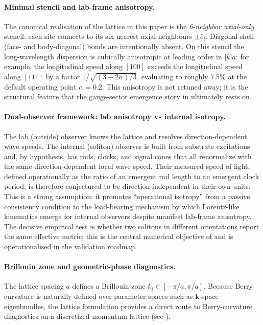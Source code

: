 \paragraph{Minimal stencil and lab-frame anisotropy.}
The canonical realisation of the lattice in this paper is the \emph{6-neighbor axial-only} stencil:
each site connects to its six nearest axial neighbours $\pm\hat{e}_i$.
Diagonal-shell (face- and body-diagonal) bonds are intentionally absent.
On this stencil the long-wavelength dispersion is cubically anisotropic at leading order in $|k|a$:
for example, the longitudinal speed along $[100]$ exceeds the longitudinal speed along $[111]$
by a factor $1/\sqrt{(3-2\alpha)/3}$, evaluating to roughly $7.5\%$ at the default operating point $\alpha=0.2$.
This anisotropy is not retuned away; it is the structural feature that the gauge-sector emergence story in
 ultimately rests on.

\paragraph{Dual-observer framework: lab anisotropy vs internal isotropy.}
\label{para:dual-observer}
The lab (outside) observer knows the lattice and resolves direction-dependent wave speeds.
The internal (soliton) observer is built from substrate excitations and, by hypothesis, has rods, clocks, and signal
cones that all renormalize with the same direction-dependent local wave speed.
Their measured speed of light, defined operationally as the ratio of an emergent rod length to an emergent clock period,
is therefore conjectured to be direction-independent in their own units.
This is a strong assumption: it promotes ``operational isotropy'' from a passive consistency condition to the
load-bearing mechanism by which Lorentz-like kinematics emerge for internal observers despite manifest lab-frame
anisotropy.
The decisive empirical test is whether two solitons in different orientations report the same effective metric;
this is the central numerical objective of  and is operationalised in the validation
roadmap.

\paragraph{Brillouin zone and geometric-phase diagnostics.}
The lattice spacing $a$ defines a Brillouin zone $k_i\in[-\pi/a,\pi/a]$.
Because Berry curvature is naturally defined over parameter spaces such as $\mathbf{k}$-space eigenbundles,
the lattice formulation provides a direct route to Berry-curvature diagnostics on a discretized momentum lattice
(see ).

